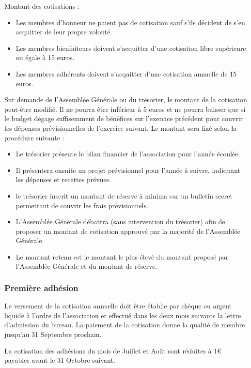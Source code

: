 \documentclass[a4paper,french,10pt]{article}
\begin{document}
Montant des cotisations :

\begin{itemize}
\item Les membres d'honneur ne paient pas de cotisation sauf s'ils décident de s'en acquitter de leur propre volonté.
\item Les membres bienfaiteurs doivent s'acquitter d'une cotisation libre supérieure ou égale à 15 euros.
\item Les membres adhérents doivent s'acquitter d'une cotisation annuelle de 15 euros.
\end{itemize}


Sur demande de l'Assemblée Générale ou du trésorier, le montant de la cotisation peut-être modifié. Il ne pourra être inférieur à 5 euros et ne pourra baisser que si le budget dégage suffisemment de bénéfices sur l'exercice précédent pour couvrir les dépenses prévisionnelles de l'exercice suivant. Le montant sera fixé selon la procédure suivante :
\begin{itemize}
\item Le trésorier présente le bilan financier de l'association pour l'année écoulée.
\item Il présentera ensuite un projet prévisionnel pour l'année à suivre, indiquant les dépenses et recettes prévues.
\item le trésorier inscrit un montant de réserve à minima sur un bulletin secret permettant de couvrir les frais prévisionnels.
\item L'Assemblée Générale débattra (sans intervention du trésorier) afin de proposer un montant de cotisation approuvé par la majorité de l'Assemblée Générale.
\item Le montant retenu est le montant le plus élevé du montant proposé par l'Assemblée Générale et du montant de réserve.
\end{itemize}

\subsubsection*{Première adhésion}

Le versement de la cotisation annuelle doit être établie par chèque ou argent liquide à l'ordre de l'association et effectué dans les deux mois suivants la lettre d'admission du bureau. La paiement de la cotisation donne la qualité de membre jusqu'au 31 Septembre prochain.

La cotisation des adhésions du mois de Juillet et Août sont réduites à 1€ payables avant le 31 Octobre suivant.
\end{document}
